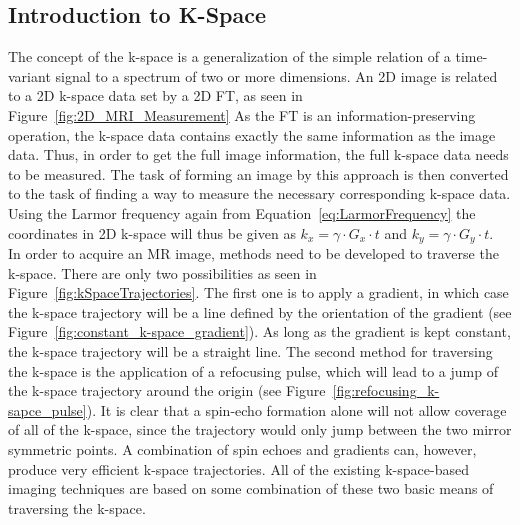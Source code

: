 \documentclass[english,version-2022-01]{uzl-thesis} %
\begin{document}
\subsection{Introduction to K-Space}
The concept of the k-space is a generalization of the simple relation of a time-variant signal to a spectrum of two or more dimensions. An 2D image is related to a 2D k-space data set by a 2D FT, as seen in Figure~\ref{fig:2D_MRI_Measurement}
As the FT is an information-preserving operation, the k-space data contains exactly the same information as the image data. Thus, in order to get the full image information, the full k-space data needs to be measured. The task of forming an image by this approach is then converted to the task of finding a way to measure the necessary corresponding k-space data. 
Using the Larmor frequency again from Equation~\ref{eq:LarmorFrequency} the coordinates in 2D k-space will thus be given as $k_x = \gamma \cdot G_x \cdot t$ and $k_y = \gamma \cdot G_y \cdot t$. \\
In order to acquire an MR image, methods need to be developed 
to traverse the k-space.
There are only two possibilities as seen in Figure~\ref{fig:kSpaceTrajectories}. The first one is to apply a gradient, in which case the k-space trajectory will be a line defined by the orientation of the gradient (see Figure~\ref{fig:constant_k-space_gradient}). As long as the gradient is kept constant, the k-space trajectory will be a straight line. 
The second method for traversing the k-space is the application of a refocusing pulse, which will lead to a jump of the k-space trajectory around the origin (see Figure~\ref{fig:refocusing_k-sapce_pulse}). It is clear that a spin-echo formation alone will not allow coverage of all of the k-space, since the trajectory would only jump between the two mirror symmetric points. A combination of spin echoes and gradients can, however, produce very efficient k-space trajectories. All of the existing k-space-based imaging techniques are based on some combination of these two basic means of traversing the k-space. \\
\end{document}
